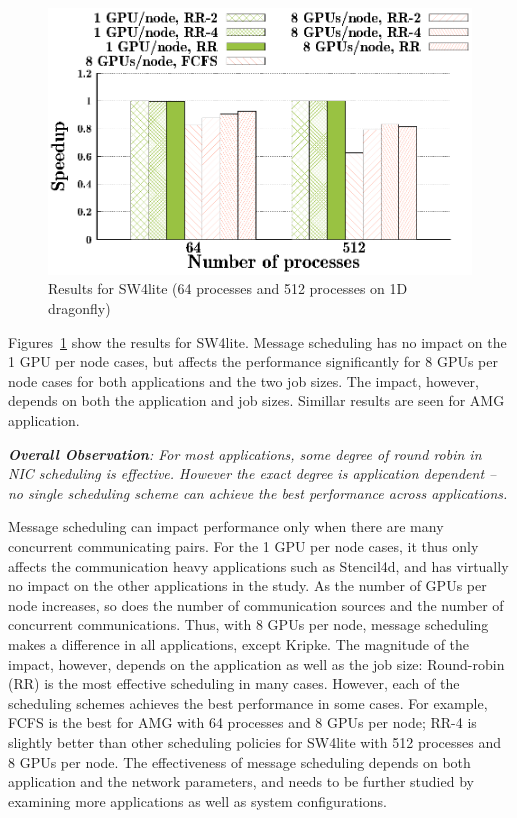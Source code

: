\begin{figure}[!htbp]
  \centering
  \includegraphics[width=0.8\columnwidth]{figure/plots/sched/dfly-sched-mapping-sw4lite.eps}
  \vspace{-0.5in}
  \caption{Results for SW4lite (64 processes and 512 processes on 1D dragonfly)}
  \label{fig:sw4lite_scheduling_dfly}
\end{figure}


Figures~\ref{fig:sw4lite_scheduling_dfly} show the
results for SW4lite. Message scheduling has no impact on the 1 GPU per node cases, but
affects the performance significantly for 8 GPUs per node cases for both applications and the two
job sizes. The impact, however, depends on both the application and job sizes.
Simillar results are seen for AMG application.

\vspace{1em}
\noindent
{\it \textbf{Overall Observation}:
For most applications, some degree of round robin in NIC scheduling is effective. However
    the exact degree is application dependent -- no single scheduling scheme can achieve the best
  performance across applications.}

Message scheduling can impact performance only when there are many concurrent
communicating pairs. For the 1 GPU per node cases, it thus only affects the
communication heavy applications such as Stencil4d, and has virtually no impact
on the other applications in the study. As the number of GPUs per node
increases, so does the  number of communication sources and the number of
concurrent communications. Thus, with 8 GPUs per node, message scheduling makes
a difference in all applications, except Kripke.  The magnitude of the impact,
however, depends on the application as well as the job size: Round-robin (RR) is
the most effective scheduling in many cases.  However, each of the scheduling
schemes achieves the best performance in some cases.
For example, FCFS is the best for AMG with 64 processes and 8 GPUs per node;
RR-4 is slightly better than other scheduling policies for SW4lite with 512
processes and 8 GPUs per node.  The effectiveness of message
scheduling depends on both application and the network parameters, and needs to
be further studied by examining more applications as well as system
configurations. 




